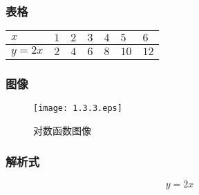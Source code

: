 \documentclass[12pt, a4paper, oneside, UTF8]{ctexbook}  %
\begin{document}
\subsubsection{表格}
\begin{table}[H]
    \begin{center}
        \begin{tabular}{|l|l|l|l|l|l|l|}
            \hline
            $x$    & $ 1$ & $2$ & $3$ & $4$ & $5$  & $6$  \\ \hline
            $y=2x$ & $2$  & $4$ & $6$ & $8$ & $10$ & $12$ \\ \hline
        \end{tabular}
    \end{center}
\end{table}
\subsubsection{图像}
\begin{figure}[H]
    \centering \texttt{[image: 1.3.3.eps]} \caption{对数函数图像}
\end{figure}
\subsubsection{解析式}
$$
    \boxed{y=2x}
$$
\end{document}
